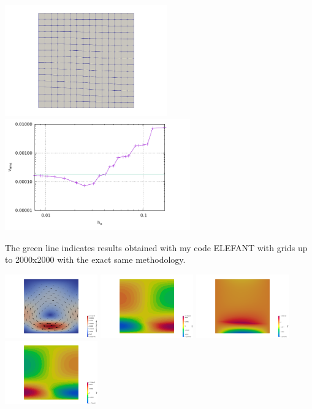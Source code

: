 \begin{center}
\includegraphics[width=7cm]{python_codes/fieldstone_25/images/grid}
\includegraphics[width=8cm]{python_codes/fieldstone_25/images/vrms.pdf}
\end{center}
The green line indicates results obtained with my code ELEFANT with grids up to 2000x2000
with the exact same methodology.

\begin{center}
\includegraphics[width=4cm]{python_codes/fieldstone_25/images/vel_128}
\includegraphics[width=4cm]{python_codes/fieldstone_25/images/exx_128}
\includegraphics[width=4cm]{python_codes/fieldstone_25/images/exy_128}
\includegraphics[width=4cm]{python_codes/fieldstone_25/images/eyy_128}
\end{center}







